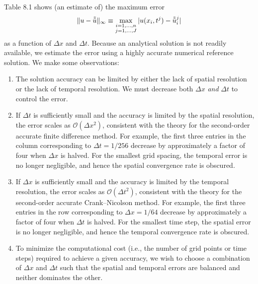 Table 8.1 shows (an estimate of) the maximum error
\[\|u - \tilde{\tilde{u}}\|_\infty \equiv \max_{\substack{i=1,\dots,n \\ j=1,\dots,J}} |u(x_i, t^j) - \tilde{\tilde{u}}_i^j|\]
as a function of $\Delta x$ and $\Delta t$. Because an analytical solution is not readily available, we estimate the error using a highly accurate numerical reference solution. We make some observations:
\begin{enumerate}
    \item The solution accuracy can be limited by either the lack of spatial resolution or the lack of temporal resolution. We must decrease both $\Delta x$ \textit{and} $\Delta t$ to control the error.
    \item If $\Delta t$ is sufficiently small and the accuracy is limited by the spatial resolution, the error scales as $\mathcal{O}(\Delta x^2)$, consistent with the theory for the second-order accurate finite difference method. For example, the first three entries in the column corresponding to $\Delta t = 1/256$ decrease by approximately a factor of four when $\Delta x$ is halved. For the smallest grid spacing, the temporal error is no longer negligible, and hence the spatial convergence rate is obscured.
    \item If $\Delta x$ is sufficiently small and the accuracy is limited by the temporal resolution, the error scales as $\mathcal{O}(\Delta t^2)$, consistent with the theory for the second-order accurate Crank--Nicolson method. For example, the first three entries in the row corresponding to $\Delta x = 1/64$ decrease by approximately a factor of four when $\Delta t$ is halved. For the smallest time step, the spatial error is no longer negligible, and hence the temporal convergence rate is obscured.
    \item To minimize the computational cost (i.e., the number of grid points or time steps) required to achieve a given accuracy, we wish to choose a combination of $\Delta x$ and $\Delta t$ such that the spatial and temporal errors are balanced and neither dominates the other.
\end{enumerate}

